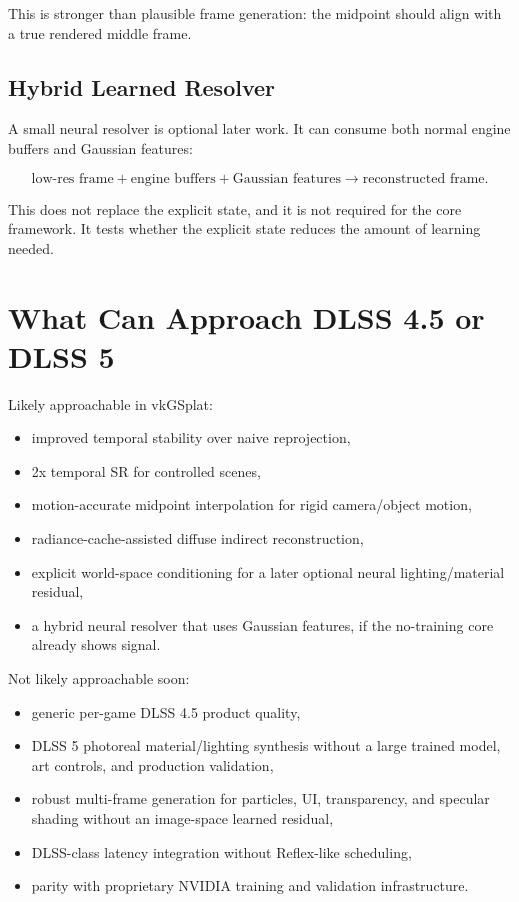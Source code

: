 \documentclass[11pt]{article}
\begin{document}
This is stronger than plausible frame generation: the midpoint should align
with a true rendered middle frame.

\subsection{Hybrid Learned Resolver}

A small neural resolver is optional later work. It can consume both normal
engine buffers and Gaussian features:

\[
  \text{low-res frame} + \text{engine buffers} + \text{Gaussian features}
  \rightarrow
  \text{reconstructed frame}.
\]

This does not replace the explicit state, and it is not required for the core
framework. It tests whether the explicit state reduces the amount of learning
needed.

\section{What Can Approach DLSS 4.5 or DLSS 5}

Likely approachable in vkGSplat:

\begin{itemize}
  \item improved temporal stability over naive reprojection,
  \item 2x temporal SR for controlled scenes,
  \item motion-accurate midpoint interpolation for rigid camera/object motion,
  \item radiance-cache-assisted diffuse indirect reconstruction,
  \item explicit world-space conditioning for a later optional neural
        lighting/material residual,
  \item a hybrid neural resolver that uses Gaussian features, if the
        no-training core already shows signal.
\end{itemize}

Not likely approachable soon:

\begin{itemize}
  \item generic per-game DLSS 4.5 product quality,
  \item DLSS 5 photoreal material/lighting synthesis without a large trained
        model, art controls, and production validation,
  \item robust multi-frame generation for particles, UI, transparency, and
        specular shading without an image-space learned residual,
  \item DLSS-class latency integration without Reflex-like scheduling,
  \item parity with proprietary NVIDIA training and validation infrastructure.
\end{itemize}
\end{document}

